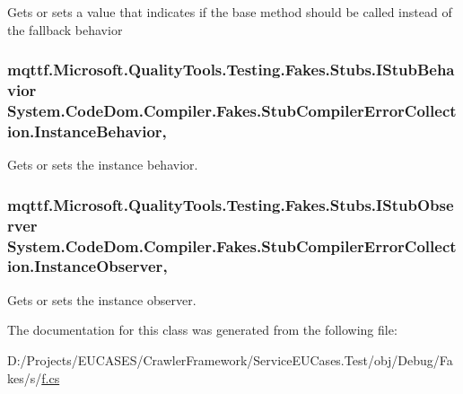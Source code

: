 Gets or sets a value that indicates if the base method should be called instead of the fallback behavior

\hypertarget{class_system_1_1_code_dom_1_1_compiler_1_1_fakes_1_1_stub_compiler_error_collection_a7ed602150ba0a4a5e44d698b7b7f6e53}{
\subsubsection[{Instance\-Behavior}]{\setlength{\rightskip}{0pt plus 5cm}mqttf.\-Microsoft.\-Quality\-Tools.\-Testing.\-Fakes.\-Stubs.\-I\-Stub\-Behavior System.\-Code\-Dom.\-Compiler.\-Fakes.\-Stub\-Compiler\-Error\-Collection.\-Instance\-Behavior\hspace{0.3cm}{\ttfamily [get]}, {\ttfamily [set]}}}\label{class_system_1_1_code_dom_1_1_compiler_1_1_fakes_1_1_stub_compiler_error_collection_a7ed602150ba0a4a5e44d698b7b7f6e53}


Gets or sets the instance behavior.

\hypertarget{class_system_1_1_code_dom_1_1_compiler_1_1_fakes_1_1_stub_compiler_error_collection_a6ef6467c67d7f6d6e4b3269fe31c3964}{
\subsubsection[{Instance\-Observer}]{\setlength{\rightskip}{0pt plus 5cm}mqttf.\-Microsoft.\-Quality\-Tools.\-Testing.\-Fakes.\-Stubs.\-I\-Stub\-Observer System.\-Code\-Dom.\-Compiler.\-Fakes.\-Stub\-Compiler\-Error\-Collection.\-Instance\-Observer\hspace{0.3cm}{\ttfamily [get]}, {\ttfamily [set]}}}\label{class_system_1_1_code_dom_1_1_compiler_1_1_fakes_1_1_stub_compiler_error_collection_a6ef6467c67d7f6d6e4b3269fe31c3964}


Gets or sets the instance observer.



The documentation for this class was generated from the following file\-:\begin{DoxyCompactItemize}
\item 
D\-:/\-Projects/\-E\-U\-C\-A\-S\-E\-S/\-Crawler\-Framework/\-Service\-E\-U\-Cases.\-Test/obj/\-Debug/\-Fakes/s/\hyperlink{s_2f_8cs}{f.\-cs}\end{DoxyCompactItemize}
